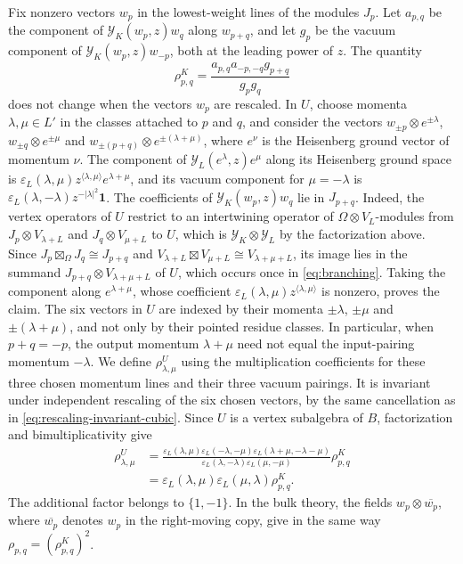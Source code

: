 \documentclass[leqno]{article}
\newcommand{\ot}{\otimes}
\newcommand{\epsi}{\varepsilon}
\numberwithin{equation}{section}
\begin{document}
Fix nonzero vectors $w_p$ in the lowest-weight lines of the modules $J_p$. Let $a_{p,q}$ be the component of $\mathcal Y_K(w_p,z)w_q$ along $w_{p+q}$, and let $g_p$ be the vacuum component of $\mathcal Y_K(w_p,z)w_{-p}$, both at the leading power of $z$. The quantity
\[
\rho^K_{p,q} = \frac{a_{p,q}a_{-p,-q}g_{p+q}}{g_pg_q}
\]
does not change when the vectors $w_p$ are rescaled. In $U$, choose momenta $\lambda,\mu \in L'$ in the classes attached to $p$ and $q$, and consider the vectors $w_{\pm p}\ot e^{\pm\lambda}$, $w_{\pm q}\ot e^{\pm\mu}$ and $w_{\pm(p+q)}\ot e^{\pm(\lambda+\mu)}$, where $e^\nu$ is the Heisenberg ground vector of momentum $\nu$. The component of $\mathcal Y_L(e^\lambda,z)e^\mu$ along its Heisenberg ground space is $\epsi_L(\lambda,\mu)z^{\langle\lambda,\mu\rangle}e^{\lambda+\mu}$, and its vacuum component for $\mu = -\lambda$ is $\epsi_L(\lambda,-\lambda)z^{-|\lambda|^2}\mathbf1$. The coefficients of $\mathcal Y_K(w_p,z)w_q$ lie in $J_{p+q}$. Indeed, the vertex operators of $U$ restrict to an intertwining operator of $\Omega\ot V_L$-modules from $J_p\ot V_{\lambda+L}$ and $J_q\ot V_{\mu+L}$ to $U$, which is $\mathcal Y_K\ot\mathcal Y_L$ by the factorization above. Since $J_p\boxtimes_\Omega J_q \cong J_{p+q}$ and $V_{\lambda+L}\boxtimes V_{\mu+L} \cong V_{\lambda+\mu+L}$, its image lies in the summand $J_{p+q}\ot V_{\lambda+\mu+L}$ of $U$, which occurs once in \eqref{eq:branching}. Taking the component along $e^{\lambda+\mu}$, whose coefficient $\epsi_L(\lambda,\mu)z^{\langle\lambda,\mu\rangle}$ is nonzero, proves the claim. The six vectors in $U$ are indexed by their momenta $\pm\lambda$, $\pm\mu$ and $\pm(\lambda+\mu)$, and not only by their pointed residue classes. In particular, when $p+q = -p$, the output momentum $\lambda+\mu$ need not equal the input-pairing momentum $-\lambda$. We define $\rho^U_{\lambda,\mu}$ using the multiplication coefficients for these three chosen momentum lines and their three vacuum pairings. It is invariant under independent rescaling of the six chosen vectors, by the same cancellation as in \eqref{eq:rescaling-invariant-cubic}. Since $U$ is a vertex subalgebra of $B$, factorization and bimultiplicativity give
\[
\begin{aligned}
\rho^U_{\lambda,\mu}
&= \frac{\epsi_L(\lambda,\mu)\epsi_L(-\lambda,-\mu)\epsi_L(\lambda+\mu,-\lambda-\mu)}{\epsi_L(\lambda,-\lambda)\epsi_L(\mu,-\mu)}\rho^K_{p,q}\\
&= \epsi_L(\lambda,\mu)\epsi_L(\mu,\lambda)\rho^K_{p,q}.
\end{aligned}
\]
The additional factor belongs to $\{1,-1\}$. In the bulk theory, the fields $w_p\ot\overline{w_p}$, where $\overline{w_p}$ denotes $w_p$ in the right-moving copy, give in the same way $\rho_{p,q} = (\rho^K_{p,q})^2$.
\end{document}
